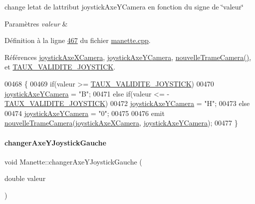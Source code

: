 change l\textquotesingle{}etat de l\textquotesingle{}attribut joystick\+Axe\+Y\+Camera en fonction du signe de \char`\"{}valeur\char`\"{} 


\begin{DoxyParams}{Paramètres}
{\em valeur} & \\
\hline
\end{DoxyParams}


Définition à la ligne \hyperlink{manette_8cpp_source_l00467}{467} du fichier \hyperlink{manette_8cpp_source}{manette.\+cpp}.



Références \hyperlink{manette_8h_source_l00257}{joystick\+Axe\+X\+Camera}, \hyperlink{manette_8h_source_l00258}{joystick\+Axe\+Y\+Camera}, \hyperlink{class_manette_a229a449e851b5f716778d19c5cf2ba49}{nouvelle\+Trame\+Camera()}, et \hyperlink{manette_8h_source_l00020}{T\+A\+U\+X\+\_\+\+V\+A\+L\+I\+D\+I\+T\+E\+\_\+\+J\+O\+Y\+S\+T\+I\+CK}.


\begin{DoxyCode}
00468 \{
00469     \textcolor{keywordflow}{if}(valeur >= \hyperlink{manette_8h_a1ae244fc787303cd46a9b684fb4b4056}{TAUX\_VALIDITE\_JOYSTICK})
00470         \hyperlink{class_manette_ab635d71c9e829d8950b9bbd13b9cdb01}{joystickAxeYCamera} = \textcolor{stringliteral}{"B"};
00471     \textcolor{keywordflow}{else} \textcolor{keywordflow}{if}(valeur <= -\hyperlink{manette_8h_a1ae244fc787303cd46a9b684fb4b4056}{TAUX\_VALIDITE\_JOYSTICK})
00472         \hyperlink{class_manette_ab635d71c9e829d8950b9bbd13b9cdb01}{joystickAxeYCamera} = \textcolor{stringliteral}{"H"};
00473     \textcolor{keywordflow}{else}
00474         \hyperlink{class_manette_ab635d71c9e829d8950b9bbd13b9cdb01}{joystickAxeYCamera} = \textcolor{stringliteral}{"0"};
00475 
00476     emit \hyperlink{class_manette_a229a449e851b5f716778d19c5cf2ba49}{nouvelleTrameCamera}(\hyperlink{class_manette_a0ca05a5c08455e74c8d944b96d8124a6}{joystickAxeXCamera}, 
      \hyperlink{class_manette_ab635d71c9e829d8950b9bbd13b9cdb01}{joystickAxeYCamera});
00477 \}
\end{DoxyCode}
\mbox{\label{class_manette_a6fd30466571a96d9789c54c8e8104ab2}} 
\paragraph{\texorpdfstring{changer\+Axe\+Y\+Joystick\+Gauche}{changerAxeYJoystickGauche}}
{\footnotesize\ttfamily void Manette\+::changer\+Axe\+Y\+Joystick\+Gauche (\begin{DoxyParamCaption}\item[{double}]{valeur }\end{DoxyParamCaption})\hspace{0.3cm}{\ttfamily [slot]}}



